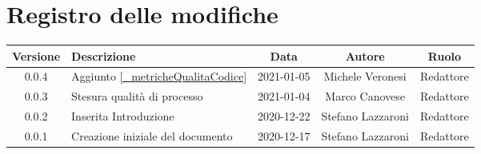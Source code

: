 \section*{Registro delle modifiche}

\begin{center}
	\begin{longtable}{|c|p{5cm}|c|c|c|}
	\hline
	\rowcolor{lighter-grayer}
	\textbf{Versione} & \textbf{Descrizione} & \textbf{Data} & \textbf{Autore} & \textbf{Ruolo} \\
	\hline
	\endfirsthead


	\hline
	0.0.4 & Aggiunto \ref{_metricheQualitaCodice} & 2021-01-05 & Michele Veronesi & Redattore \\
	0.0.3 & Stesura qualità di processo & 2021-01-04 & Marco Canovese & Redattore \\
	0.0.2 & Inserita Introduzione & 2020-12-22 & Stefano Lazzaroni & Redattore\\
    0.0.1 & Creazione iniziale del documento & 2020-12-17 & Stefano Lazzaroni & Redattore\\
	\hline

	\end{longtable}
\end{center}